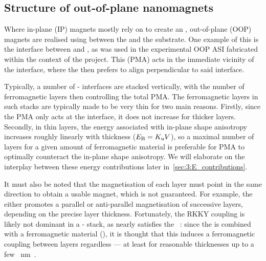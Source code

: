 \subsection{Structure of out-of-plane nanomagnets} %
\label{sec:3:OOP_nanomagnet_PMA}
Where in-plane (IP) magnets mostly rely on  to create an , out-of-plane (OOP) magnets are realised using  between the  and the substrate.
One example of this is the interface between  and , as was used in the experimental OOP ASI fabricated within the context of the \spinengine project.
This  (PMA) acts in the immediate vicinity of the interface, where the  then prefers to align perpendicular to said interface. \par
Typically, a number of - interfaces are stacked vertically, with the number of ferromagnetic  layers then controlling the total PMA.
The ferromagnetic layers in such stacks are typically made to be very thin for two main reasons.
Firstly, since the PMA only acts at the interface, it does not increase for thicker layers.
Secondly, in thin layers, the energy associated with in-plane shape anisotropy increases roughly linearly with thickness ($E_\mathrm{B}=K_\mathrm{u}V$), so a maximal number of layers for a given amount of ferromagnetic material is preferable for PMA to optimally counteract the in-plane shape anisotropy.
We will elaborate on the interplay between these energy contributions later in~\cref{sec:3:E_contributions}. \par
It must also be noted that the magnetisation of each  layer must point in the same direction to obtain a usable magnet, which is not guaranteed.
For example, the ~\cite{RKKY_RK,RKKY_K,RKKY_Y} either promotes a parallel or anti-parallel magnetisation of successive  layers, depending on the precise  layer thickness.
Fortunately, the RKKY coupling is likely not dominant in a - stack, as  nearly satisfies the ~\cite{PtMagneticOrder}: since the  is combined with a ferromagnetic material (), it is thought that this induces a ferromagnetic coupling between  layers regardless --- at least for reasonable  thicknesses up to a few \SI{}{\nano\metre}~\cite{PerpendicularMagnetizationASI}.

